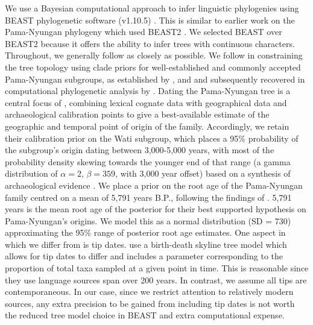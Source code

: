 \documentclass[]{article}
\begin{document}
We use a Bayesian computational approach to infer linguistic phylogenies using BEAST phylogenetic software (v1.10.5) \autocite{suchard_bayesian_2018}. This is similar to earlier work on the Pama-Nyungan phylogeny \autocites{bowern_computational_2012}{bouckaert_origin_2018} which used BEAST2 \autocite{bouckaert_beast_2019}. We selected BEAST over BEAST2 because it offers the ability to infer trees with continuous characters. Throughout, we generally follow \textcite{bouckaert_origin_2018} as closely as possible. We follow \textcite{bouckaert_origin_2018} in constraining the tree topology using clade priors for well-established and commonly accepted Pama-Nyungan subgroups, as established by \textcite{ogrady_languages_1966}, \textcite{muhlhausler_atlas_1996} and \textcite{koch_languages_2014} and subsequently recovered in computational phylogenetic analysis by \textcite{bowern_computational_2012}. Dating the Pama-Nyungan tree is a central focus of \textcite{bouckaert_origin_2018}, combining lexical cognate data with geographical data and archaeological calibration points to give a best-available estimate of the geographic and temporal point of origin of the family. Accordingly, we retain their calibration prior on the Wati subgroup, which places a 95\% probability of the subgroup's origin dating between 3,000-5,000 years, with most of the probability density skewing towards the younger end of that range (a gamma distribution of \(\alpha = 2\), \(\beta = 359\), with 3,000 year offset) based on a synthesis of archaeological evidence \autocite[see][p.~746]{bouckaert_origin_2018}. We place a prior on the root age of the Pama-Nyungan family centred on a mean of 5,791 years B.P., following the findings of \textcite{bouckaert_origin_2018}. 5,791 years is the mean root age of the posterior for their best supported hypothesis on Pama-Nyungan's origins. We model this as a normal distribution (SD = 730) approximating the 95\% range of posterior root age estimates. One aspect in which we differ from \textcite{bouckaert_origin_2018} is tip dates. \textcite{bouckaert_origin_2018} use a birth-death skyline tree model which allows for tip dates to differ and includes a parameter corresponding to the proportion of total taxa sampled at a given point in time. This is reasonable since they use language sources span over 200 years. In contrast, we assume all tips are contemporaneous. In our case, since we restrict attention to relatively modern sources, any extra precision to be gained from including tip dates is not worth the reduced tree model choice in BEAST and extra computational expense.
\end{document}
